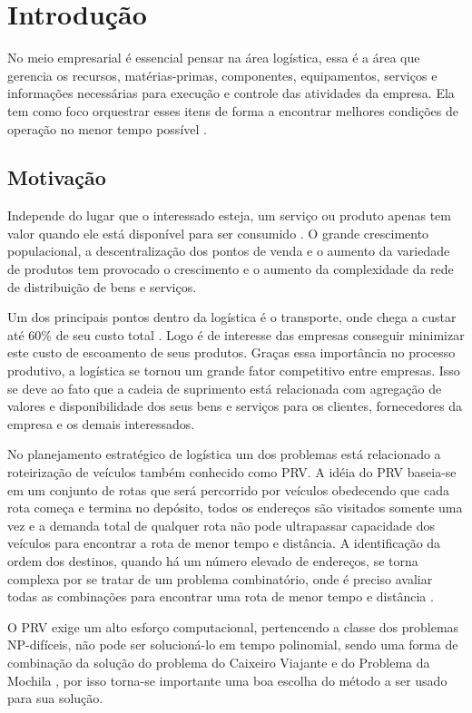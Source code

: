 \chapter[Introdução]{Introdução}

No meio empresarial é essencial pensar na área logística, essa é a área que gerencia os recursos, matérias-primas, componentes, equipamentos, serviços e informações necessárias para execução e controle das atividades da empresa. Ela tem como foco orquestrar esses itens de forma a encontrar melhores condições de operação no menor tempo possível \cite{DIAS}. 

\section{Motivação}

Independe do lugar que o interessado esteja, um serviço ou produto apenas tem
valor quando ele está disponível para ser consumido \cite{TSUDA}. O grande crescimento populacional, a descentralização dos pontos de venda e o aumento da variedade de produtos tem provocado o crescimento e o aumento da complexidade da rede de distribuição de bens e serviços.

Um dos principais pontos dentro da logística é o transporte, onde chega a custar até
60\% de seu custo total \cite{RODRIGUES}. Logo é de interesse das empresas conseguir minimizar este custo de escoamento de seus produtos. Graças essa importância no processo produtivo, a logística se tornou um grande fator competitivo entre empresas. Isso se deve ao fato que a cadeia de suprimento está relacionada com agregação de valores e disponibilidade dos seus bens e serviços para os clientes, fornecedores da empresa e os demais interessados. 

No planejamento estratégico de logística um dos problemas está relacionado a roteirização de veículos \cite{TSUDA} também conhecido como PRV. 
A idéia do PRV baseia-se em um conjunto de rotas que será percorrido por veículos obedecendo que cada rota começa e termina no depósito, todos os endereços são visitados somente uma vez e a demanda total de qualquer rota não pode ultrapassar capacidade dos veículos para encontrar a rota de menor tempo e distância. A identificação da ordem dos destinos, quando há um número elevado de endereços, se torna complexa por se tratar de um problema combinatório, onde é preciso avaliar todas as combinações para encontrar uma rota de menor tempo e distância \cite{RMKarp}.

O PRV exige um alto esforço computacional, pertencendo a classe dos problemas NP-difíceis, não pode ser solucioná-lo em tempo polinomial, sendo uma forma de combinação da solução do problema do Caixeiro Viajante e do Problema da Mochila \cite{HUMBERTO}, por isso torna-se importante uma boa escolha do método a ser usado para sua solução.


